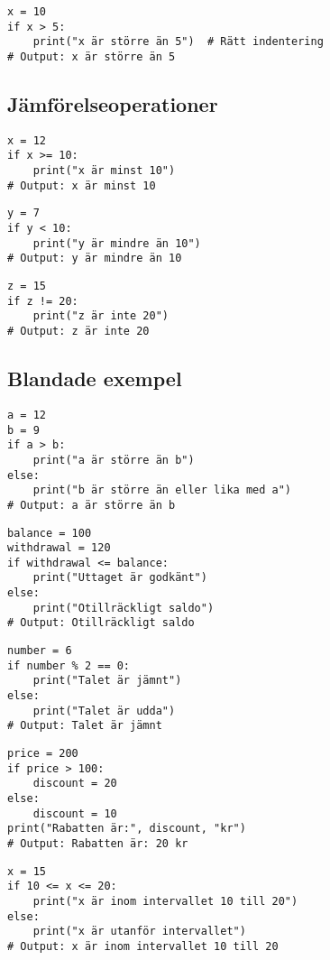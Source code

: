 \begin{lstlisting}[title=Exempel 7: Korrekt indentering]
x = 10
if x > 5:
    print("x är större än 5")  # Rätt indentering
# Output: x är större än 5
\end{lstlisting}

\subsection*{Jämförelseoperationer}

\begin{lstlisting}[title=Exempel 8: Kontrollera större än eller lika med]
x = 12
if x >= 10:
    print("x är minst 10")
# Output: x är minst 10
\end{lstlisting}

\begin{lstlisting}[title=Exempel 9: Kontrollera mindre än]
y = 7
if y < 10:
    print("y är mindre än 10")
# Output: y är mindre än 10
\end{lstlisting}

\begin{lstlisting}[title=Exempel 10: Kontrollera olika värden]
z = 15
if z != 20:
    print("z är inte 20")
# Output: z är inte 20
\end{lstlisting}

\subsection*{Blandade exempel}

\begin{lstlisting}[title=Exempel 11: Använda if för att hitta det största värdet]
a = 12
b = 9
if a > b:
    print("a är större än b")
else:
    print("b är större än eller lika med a")
# Output: a är större än b
\end{lstlisting}

\begin{lstlisting}[title=Exempel 12: If-sats med variabler i flera steg]
balance = 100
withdrawal = 120
if withdrawal <= balance:
    print("Uttaget är godkänt")
else:
    print("Otillräckligt saldo")
# Output: Otillräckligt saldo
\end{lstlisting}

\begin{lstlisting}[title=Exempel 13: Kontrollera om ett tal är jämnt]
number = 6
if number % 2 == 0:
    print("Talet är jämnt")
else:
    print("Talet är udda")
# Output: Talet är jämnt
\end{lstlisting}

\begin{lstlisting}[title=Exempel 14: If-sats för flera steg av diskontering]
price = 200
if price > 100:
    discount = 20
else:
    discount = 10
print("Rabatten är:", discount, "kr")
# Output: Rabatten är: 20 kr
\end{lstlisting}

\begin{lstlisting}[title=Exempel 15: Kontrollera intervall med if-satser]
x = 15
if 10 <= x <= 20:
    print("x är inom intervallet 10 till 20")
else:
    print("x är utanför intervallet")
# Output: x är inom intervallet 10 till 20
\end{lstlisting}
